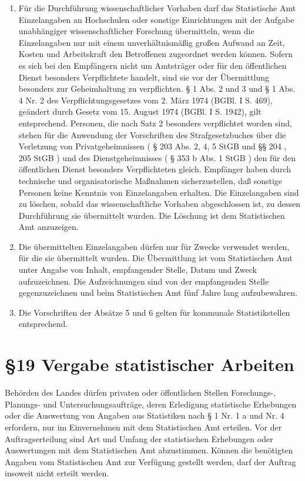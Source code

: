 \begin{enumerate}
            \item Für die Durchführung wissenschaftlicher Vorhaben darf das Statistische Amt Einzelangaben an Hochschulen oder sonstige Einrichtungen mit der Aufgabe unabhängiger wissenschaftlicher Forschung übermitteln, wenn die Einzelangaben nur mit einem unverhältnismäßig großen Aufwand an Zeit, Kosten und Arbeitskraft den Betroffenen zugeordnet werden können. Sofern es sich bei den Empfängern nicht um Amtsträger oder für den öffentlichen Dienst besonders Verpflichtete handelt, sind sie vor der Übermittlung besonders zur Geheimhaltung zu verpflichten. § 1 Abs. 2 und 3 und § 1 Abs. 4 Nr. 2 des Verpflichtungsgesetzes vom 2. März 1974 (BGBl. I S. 469), geändert durch Gesetz vom 15. August 1974 (BGBl. I S. 1942), gilt entsprechend. Personen, die nach Satz 2 besonders verpflichtet worden sind, stehen für die Anwendung der Vorschriften des Strafgesetzbuches über die Verletzung von Privatgeheimnissen ( § 203 Abs. 2, 4, 5 StGB und §§ 204 , 205 StGB ) und des Dienstgeheimnisses ( § 353 b Abs. 1 StGB ) den für den öffentlichen Dienst besonders Verpflichteten gleich. Empfänger haben durch technische und organisatorische Maßnahmen sicherzustellen, daß sonstige Personen keine Kenntnis von Einzelangaben erhalten. Die Einzelangaben sind zu löschen, sobald das wissenschaftliche Vorhaben abgeschlossen ist, zu dessen Durchführung sie übermittelt wurden. Die Löschung ist dem Statistischen Amt anzuzeigen.
            \item Die übermittelten Einzelangaben dürfen nur für Zwecke verwendet werden, für die sie übermittelt wurden. Die Übermittlung ist vom Statistischen Amt unter Angabe von Inhalt, empfangender Stelle, Datum und Zweck aufzuzeichnen. Die Aufzeichnungen sind von der empfangenden Stelle gegenzuzeichnen und beim Statistischen Amt fünf Jahre lang aufzubewahren.
            \item Die Vorschriften der Absätze 5 und 6 gelten für kommunale Statistikstellen entsprechend.
        \end{enumerate}
 
    \section{\S19 Vergabe statistischer Arbeiten}
    Behörden des Landes dürfen privaten oder öffentlichen Stellen Forschungs-, Planungs- und Untersuchungsaufträge, deren Erledigung statistische Erhebungen oder die Auswertung von Angaben aus Statistiken nach § 1 Nr. 1 a und Nr. 4 erfordern, nur im Einvernehmen mit dem Statistischen Amt erteilen. Vor der Auftragserteilung sind Art und Umfang der statistischen Erhebungen oder Auswertungen mit dem Statistischen Amt abzustimmen. Können die benötigten Angaben vom Statistischen Amt zur Verfügung gestellt werden, darf der Auftrag insoweit nicht erteilt werden.
 
